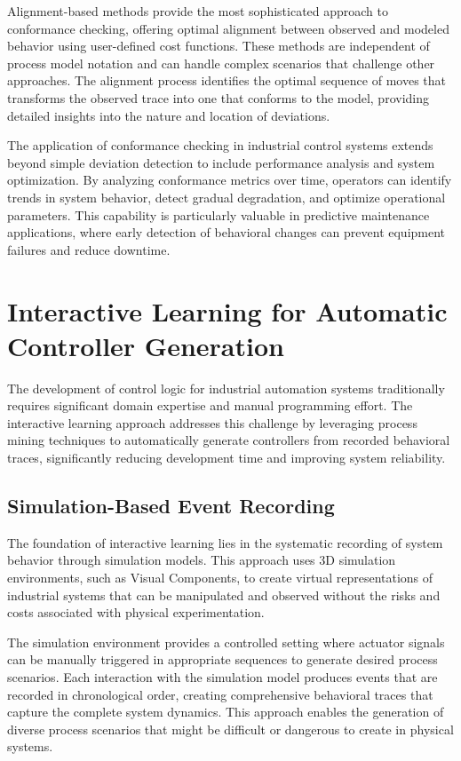 Alignment-based methods provide the most sophisticated approach to conformance checking, offering optimal alignment between observed and modeled behavior using user-defined cost functions. These methods are independent of process model notation and can handle complex scenarios that challenge other approaches. The alignment process identifies the optimal sequence of moves that transforms the observed trace into one that conforms to the model, providing detailed insights into the nature and location of deviations.

The application of conformance checking in industrial control systems extends beyond simple deviation detection to include performance analysis and system optimization. By analyzing conformance metrics over time, operators can identify trends in system behavior, detect gradual degradation, and optimize operational parameters. This capability is particularly valuable in predictive maintenance applications, where early detection of behavioral changes can prevent equipment failures and reduce downtime.

\section{Interactive Learning for Automatic Controller Generation}

The development of control logic for industrial automation systems traditionally requires significant domain expertise and manual programming effort. The interactive learning approach addresses this challenge by leveraging process mining techniques to automatically generate controllers from recorded behavioral traces, significantly reducing development time and improving system reliability.

\subsection{Simulation-Based Event Recording}

The foundation of interactive learning lies in the systematic recording of system behavior through simulation models. This approach uses 3D simulation environments, such as Visual Components, to create virtual representations of industrial systems that can be manipulated and observed without the risks and costs associated with physical experimentation.

The simulation environment provides a controlled setting where actuator signals can be manually triggered in appropriate sequences to generate desired process scenarios. Each interaction with the simulation model produces events that are recorded in chronological order, creating comprehensive behavioral traces that capture the complete system dynamics. This approach enables the generation of diverse process scenarios that might be difficult or dangerous to create in physical systems.

